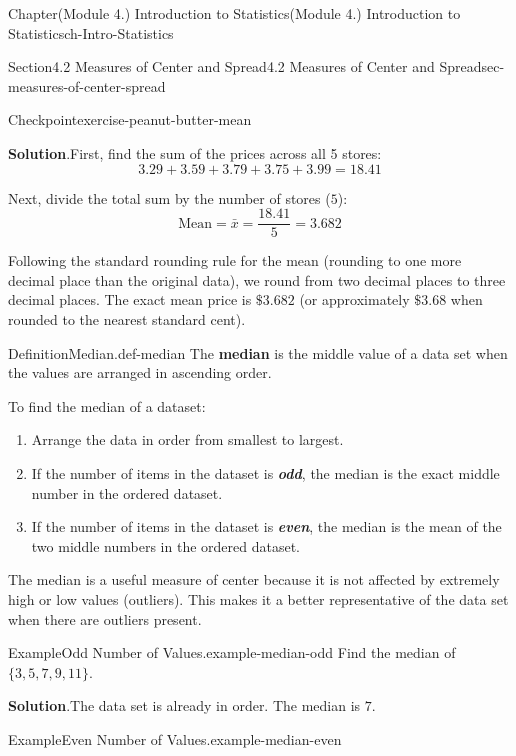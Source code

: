 \documentclass[oneside,10pt,]{book}
\newcommand{\blocktitlefont}{\relax}
\newcommand{\alert}[1]{\textbf{\textit{#1}}}
\newcommand{\terminology}[1]{\textbf{#1}}
\begin{document}
\begin{chapterptx}{Chapter}{(Module 4.) Introduction to Statistics}{}{(Module 4.) Introduction to Statistics}{}{}{ch-Intro-Statistics}
\begin{sectionptx}{Section}{4.2 Measures of Center and Spread}{}{4.2 Measures of Center and Spread}{}{}{sec-measures-of-center-spread}
\begin{inlineexercise}{Checkpoint}{}{exercise-peanut-butter-mean}
\par\smallskip%
\noindent\textbf{\blocktitlefont Solution}.\hypertarget{exercise-peanut-butter-mean-2}{}\quad{}First, find the sum of the prices across all 5 stores:%
\begin{equation*}
3.29 + 3.59 + 3.79 + 3.75 + 3.99 = 18.41
\end{equation*}
%
\par
Next, divide the total sum by the number of stores (\(5\)):%
\begin{equation*}
\text{Mean} =\bar{x} = \dfrac{18.41}{5} = 3.682
\end{equation*}
%
\par
Following the standard rounding rule for the mean (rounding to one more decimal place than the original data), we round from two decimal places to three decimal places. The exact mean price is \(\$3.682\) (or approximately \(\$3.68\) when rounded to the nearest standard cent).%
\end{inlineexercise}%
\begin{definition}{Definition}{Median.}{def-median}%
The \terminology{median} is the middle value of a data set when the values are arranged in ascending order.%
\par
To find the median of a dataset:%
\par
%
\begin{enumerate}
\item{}Arrange the data in order from smallest to largest.%
\item{}If the number of items in the dataset is \alert{odd}, the median is the exact middle number in the ordered dataset.%
\item{}If the number of items in the dataset is \alert{even}, the median is the mean of the two middle numbers in the ordered dataset.%
\end{enumerate}
%
\end{definition}
The median is a useful measure of center because it is not affected by extremely high or low values (outliers). This makes it a better representative of the data set when there are outliers present.%
\begin{example}{Example}{Odd Number of Values.}{example-median-odd}%
Find the median of \(\{3,5,7,9,11\}\).%
\par\smallskip%
\noindent\textbf{\blocktitlefont Solution}.\hypertarget{example-median-odd-3}{}\quad{}The data set is already in order. The median is \(7\).%
\end{example}
\begin{example}{Example}{Even Number of Values.}{example-median-even}%

\end{example}
\end{sectionptx}
\end{chapterptx}
\end{document}
